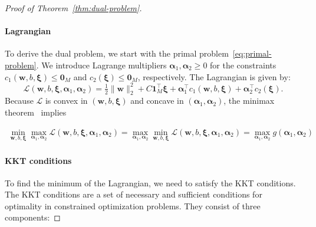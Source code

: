 \begin{proof}[Proof of Theorem~\ref{thm:dual-problem}]{}
	\vspace{-0.4cm}
	\paragraph{Lagrangian} To derive the dual problem, we start with the primal problem~\eqref{eq:primal-problem}.
	We introduce Lagrange multipliers $\symbf{\alpha}_1,\symbf{\alpha}_2 \geq 0$ for the constraints $c_1(\symbf{w},b,\symbf{\xi}) \leq \symbf{0}_M$ and $c_2(\symbf{\xi}) \leq \symbf{0}_M$, respectively. The Lagrangian is given by:
	\[
		\mathcal{L}\left(\symbf{w}, b, \symbf{\xi}, \symbf{\alpha}_1,\symbf{\alpha}_2\right) =\tfrac12\|\symbf{w}\|_2^2 +C\symbf{1}_M^\top \symbf{\xi} +\symbf{\alpha}_1^\top c_1(\symbf{w},b,\symbf{\xi}) +\symbf{\alpha}_2^\top c_2(\symbf{\xi}).
	\]
	Because $\mathcal{L}$ is convex in $(\symbf{w},b,\symbf{\xi})$ and concave in $(\symbf{\alpha}_1,\symbf{\alpha}_2)$, the minimax theorem~\cite{vonNeumann1928} implies

	\begin{align*}
		\min_{\symbf{w},b,\symbf{\xi}}\max_{\symbf{\alpha}_1,\symbf{\alpha}_2}\mathcal{L}(\symbf{w},b,\symbf{\xi},\symbf{\alpha}_1,\symbf{\alpha}_2)= \max_{\symbf{\alpha}_1,\symbf{\alpha}_2}\min_{\symbf{w},b,\symbf{\xi}}\mathcal{L}(\symbf{w},b,\symbf{\xi},\symbf{\alpha}_1,\symbf{\alpha}_2) = \max_{\symbf{\alpha}_1,\symbf{\alpha}_2} g(\symbf{\alpha}_1,\symbf{\alpha}_2)
	\end{align*}

	\paragraph{KKT conditions}
	To find the minimum of the Lagrangian, we need to satisfy the KKT conditions. The KKT conditions are a set of necessary and sufficient conditions for optimality in constrained optimization problems. They consist of three components:

\end{proof}
